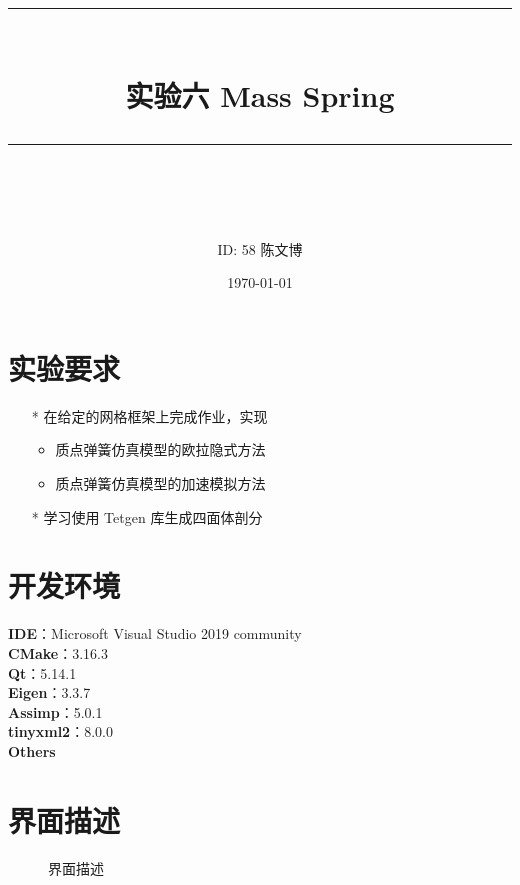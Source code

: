 \documentclass[14pt]{scrartcl} %
\title{	
	\normalfont\normalsize
	\rule{\linewidth}{0.5pt}\\ %
	\vspace{20pt} %
	{\huge 实验六	Mass Spring}\\ %
	\vspace{12pt} %
	\rule{\linewidth}{2pt}\\ %
	\vspace{12pt} %
}
\author{\LARGE ID: 58		陈文博} %
\date{\normalsize\today} %
\begin{document}
\maketitle %


\section{实验要求}


\begin{itemize}
	\item[*] 在给定的网格框架上完成作业，实现
	\begin{itemize}
		\item 质点弹簧仿真模型的欧拉隐式方法
		\item 质点弹簧仿真模型的加速模拟方法
	\end{itemize}
	\item[*] 学习使用 Tetgen 库生成四面体剖分
\end{itemize}


\section{开发环境}

\textbf{IDE}：Microsoft Visual Studio 2019 community\\
\textbf{CMake}：3.16.3\\
\textbf{Qt}：5.14.1\\
\textbf{Eigen}：3.3.7\\
\textbf{Assimp}：5.0.1\\
\textbf{tinyxml2}：8.0.0\\
\textbf{Others}

\section{界面描述}
\begin{figure}[h] %
	\centering
	\caption{界面描述}
\end{figure}
\end{document}
